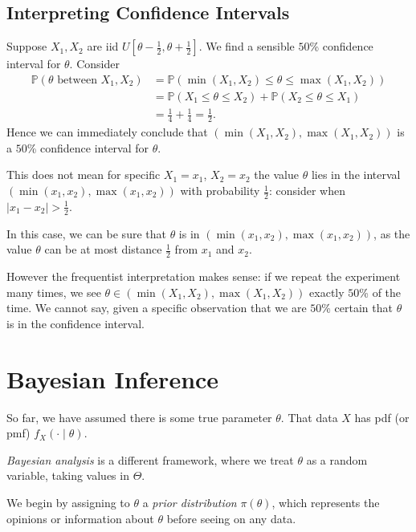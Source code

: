 \documentclass[12pt]{article}
\begin{document}
\subsection{Interpreting Confidence Intervals}
\label{sub:interpreting_confidence_intervals}

Suppose $X_1, X_2$ are iid $U[\theta-\frac{1}{2}, \theta+\frac{1}{2}]$. We find a sensible $50$\% confidence interval for $\theta$. Consider
\begin{align*}
	\mathbb{P}(\theta \text{ between } X_1, X_2) &= \mathbb{P}(\min(X_1,X_2) \leq \theta \leq \max(X_1,X_2)) \\
						     &= \mathbb{P}(X_1 \leq \theta \leq X_2) + \mathbb{P}(X_2 \leq \theta \leq X_1) \\
						     &= \frac{1}{4} + \frac{1}{4} = \frac{1}{2}.
\end{align*}
Hence we can immediately conclude that $(\min(X_1, X_2), \max(X_1,X_2))$ is a $50$\% confidence interval for $\theta$.

This does not mean for specific $X_1 = x_1$, $X_2 = x_2$ the value $\theta$ lies in the interval $(\min(x_1,x_2), \max(x_1,x_2))$ with probability $\frac{1}{2}$: consider when $|x_1 - x_2| > \frac{1}{2}$.

In this case, we can be sure that $\theta$ is in $(\min(x_1, x_2), \max(x_1, x_2))$, as the value $\theta$ can be at most distance $\frac{1}{2}$ from $x_1$ and $x_2$.

However the frequentist interpretation makes sense: if we repeat the experiment many times, we see $\theta \in (\min(X_1, X_2), \max(X_1,X_2))$ exactly $50$\% of the time. We cannot say, given a specific observation that we are $50$\% certain that $\theta$ is in the confidence interval.

\newpage

\section{Bayesian Inference}
\label{sec:bayesian_inference}

So far, we have assumed there is some true parameter $\theta$. That data $X$ has pdf (or pmf) $f_X(\cdot \mid \theta)$.

\emph{Bayesian analysis} is a different framework, where we treat $\theta$ as a random variable, taking values in $\Theta$.

We begin by assigning to $\theta$ a \emph{prior distribution} $\pi(\theta)$, which represents the opinions or information about $\theta$ before seeing on any data.
\end{document}

